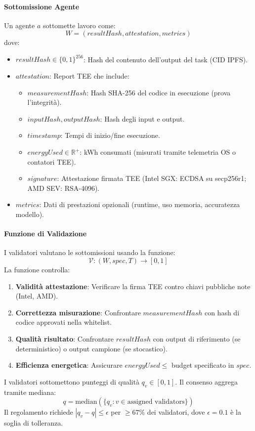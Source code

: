 \documentclass[11pt]{article}
\begin{document}
\begin{itemize}[noitemsep]
\paragraph{Sottomissione Agente} Un agente $a$ sottomette lavoro come:
\begin{equation}
W = (resultHash, attestation, metrics)
\end{equation}
dove:
\begin{itemize}[noitemsep]
  \item $resultHash \in \{0,1\}^{256}$: Hash del contenuto dell'output del task (CID IPFS).
  \item $attestation$: Report TEE che include:
    \begin{itemize}[noitemsep]
      \item $measurementHash$: Hash SHA-256 del codice in esecuzione (prova l'integrità).
      \item $inputHash, outputHash$: Hash degli input e output.
      \item $timestamp$: Tempi di inizio/fine esecuzione.
      \item $energyUsed \in \mathbb{R}^+$: kWh consumati (misurati tramite telemetria OS o contatori TEE).
      \item $signature$: Attestazione firmata TEE (Intel SGX: ECDSA su secp256r1; AMD SEV: RSA-4096).
    \end{itemize}
  \item $metrics$: Dati di prestazioni opzionali (runtime, uso memoria, accuratezza modello).
\end{itemize}

\paragraph{Funzione di Validazione} I validatori valutano le sottomissioni usando la funzione:
\begin{equation}
\mathcal{V}: (W, spec, T) \rightarrow [0, 1]
\end{equation}
La funzione controlla:
\begin{enumerate}[noitemsep]
  \item \textbf{Validità attestazione}: Verificare la firma TEE contro chiavi pubbliche note (Intel, AMD).
  \item \textbf{Correttezza misurazione}: Confrontare $measurementHash$ con hash di codice approvati nella whitelist.
  \item \textbf{Qualità risultato}: Confrontare $resultHash$ con output di riferimento (se deterministico) o output campione (se stocastico).
  \item \textbf{Efficienza energetica}: Assicurare $energyUsed \leq$ budget specificato in $spec$.
\end{enumerate}
I validatori sottomettono punteggi di qualità $q_v \in [0,1]$. Il consenso aggrega tramite mediana:
\begin{equation}
q = \text{median}(\{q_v : v \in \text{assigned validators}\})
\end{equation}
Il regolamento richiede $|q_v - q| \leq \epsilon$ per $\geq 67\%$ dei validatori, dove $\epsilon = 0.1$ è la soglia di tolleranza.


\end{itemize}
\end{document}
